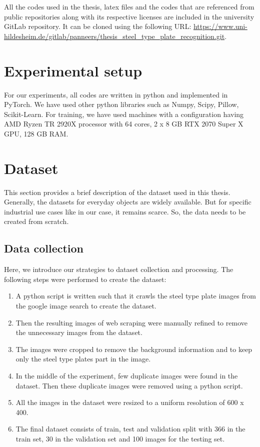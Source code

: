 	All the codes used in the thesis, latex files and the codes that are referenced from public repositories along with its respective licenses are included in the university GitLab repository. It can be cloned using the following URL: \url{https://www.uni-hildesheim.de/gitlab/panneers/thesis_steel_type_plate_recognition.git}.

\section{Experimental setup}
For our experiments, all codes are written in python and implemented in PyTorch. We have used other python libraries such as Numpy, Scipy, Pillow, Scikit-Learn. For training, we have used machines with a configuration having AMD Ryzen TR 2920X processor with 64 cores, 2 x 8 GB RTX 2070 Super X GPU, 128 GB RAM.

\section{Dataset}\label{sec:dataset}

This section provides a brief description of the dataset used in this thesis. Generally, the datasets for everyday objects are widely available. But for specific industrial use cases like in our case, it remains scarce. So, the data needs to be created from scratch.

\subsection{Data collection}
	Here, we introduce our strategies to dataset collection and processing. The following steps were performed to create the dataset:
\begin{enumerate}
\item A python script is written such that it crawls the steel type plate images from the google image search to create the dataset. 
\item Then the resulting images of web scraping were manually refined to remove the unnecessary images from the dataset. 
\item The images were cropped to remove the background information and to keep only the steel type plates part in the image.
\item In the middle of the experiment, few duplicate images were found in the dataset. Then these duplicate images were removed using a python script.
\item All the images in the dataset were resized to a uniform resolution of 600 x 400.
\item The final dataset consists of train, test and validation split with 366 in the train set, 30 in the validation set and 100 images for the testing set.
\end{enumerate}

